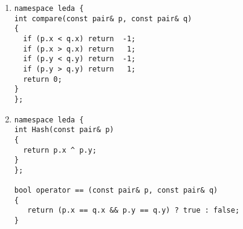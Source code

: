 \begin{enumerate}
        \item 
\begin{verbatim}namespace leda {
int compare(const pair& p, const pair& q)
{
  if (p.x < q.x) return  -1;
  if (p.x > q.x) return   1; 
  if (p.y < q.y) return  -1;
  if (p.y > q.y) return   1;
  return 0;
}
};
\end{verbatim}
        


        \item 
\begin{verbatim}namespace leda {
int Hash(const pair& p)
{
  return p.x ^ p.y;
}
};

bool operator == (const pair& p, const pair& q)
{
   return (p.x == q.x && p.y == q.y) ? true : false;
}
\end{verbatim}
        




      
\end{enumerate}





    





 
